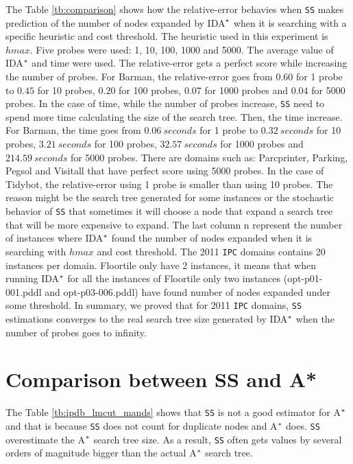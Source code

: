 The Table \ref{tb:comparison} shows how the relative-error behavies when \texttt{SS} makes prediction of the number of nodes expanded by IDA$\sp{*}$ when it is searching with a specific heuristic and cost threshold. The heuristic used in this experiment is $hmax$. Five probes were used: 1, 10, 100, 1000 and 5000. The average value of IDA$\sp{*}$ and time were used. The relative-error gets a perfect score while increasing the number of probes. For Barman, the relative-error goes from $0.60$ for 1 probe to $0.45$ for 10 probes, $0.20$ for 100 probes, $0.07$ for 1000 probes and $0.04$ for 5000 probes. In the case of time, while the number of probes increase, \texttt{SS} need to spend more time calculating the size of the search tree. Then, the time increase. For Barman, the time goes from $0.06\ seconds$ for 1 probe to $0.32\ seconds$ for 10 probes, $3.21\ seconds$ for 100 probes, $32.57\ seconds$ for 1000 probes and $214.59\ seconds$ for 5000 probes. There are domains such as: Parcprinter, Parking, Pegsol and Visitall that have perfect score using 5000 probes. In the case of Tidybot, the relative-error using 1 probe is smaller than using 10 probes. The reason might be the search tree generated for some instances or the stochastic behavior of \texttt{SS} that sometimes it will choose a node that expand a search tree that will be more expensive to expand. The last column \textsf{n} represent the number of instances where IDA$\sp{*}$ found the number of nodes expanded when it is searching with $hmax$ and cost threshold. The 2011 \texttt{IPC} domains contains 20 instances per domain. Floortile only have 2 instances, it means that when running IDA$\sp{*}$ for all the instances of Floortile only two instances (opt-p01-001.pddl and opt-p03-006.pddl) have found number of nodes expanded under some threshold. In summary, we proved that for 2011 \texttt{IPC} domains, \texttt{SS} estimations converges to the real search tree size generated by IDA$\sp{*}$ when the number of probes goes to infinity.

\section{Comparison between SS and A*}
\noindent
The Table \ref{tb:ipdb_lmcut_mands} shows that \texttt{SS} is not a good estimator for A$\sp{*}$ and that is because \texttt{SS} does not count for duplicate nodes and A$\sp{*}$ does. \texttt{SS} overestimate the A$\sp{*}$ search tree size. As a result, \texttt{SS} often gets values by several orders of magnitude bigger than the actual A$\sp{*}$ search tree.


